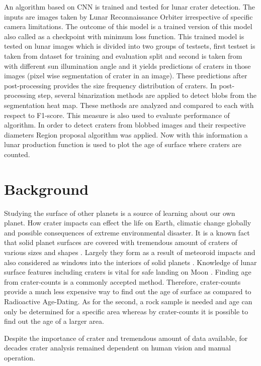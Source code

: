 \documentclass[11pt]{article}
\begin{document}
An algorithm based on CNN is trained and tested for lunar crater detection. The inputs are images taken by Lunar Reconnaissance Orbiter irrespective of specific camera limitations. The outcome of this model is a trained version of this model also called as a checkpoint with minimum loss function. This trained model is tested on lunar images which is divided into two groups of testsets, first testset is taken from dataset for training and evaluation split and second is taken from \cite{dino2020} with different sun illumination angle and it yields predictions of craters in those images (pixel wise segmentation of crater in an image). These predictions after post-processing provides the size frequency distribution of craters. In post-processing step, several binarization methods are applied to detect blobs from the segmentation heat map. These methods are analyzed and compared to each with respect to F1-score. This measure is also used to evaluate performance of algorithm. In order to detect craters from blobbed images and their respective diameters Region proposal algorithm was applied. Now with this information a lunar production function is used to plot the age of surface where craters are counted.

\section{Background}
Studying the surface of other planets is a source of learning about our own planet. How crater impacts can effect the life on Earth, climatic change globally and possible consequences of extreme environmental disaster. It is a known fact that solid planet surfaces are covered with tremendous amount of craters of various sizes and shapes \cite{melosh1988rocky}. Largely they form as a result of meteoroid impacts and also considered as windows into the interiors of solid planets \cite{honda2000crater}. Knowledge of lunar surface features including craters is vital for safe landing on Moon \cite{ivanov2015probabilistic}. Finding age from crater-counts is a commonly accepted method. Therefore, crater-counts provide a much less expensive way to find out the age of surface as compared to Radioactive Age-Dating. As for the second, a rock sample is needed and age can only be determined for a specific area whereas by crater-counts it is possible to find out the age of a larger area.

Despite the importance of crater and tremendous amount of data available, for decades crater analysis remained dependent on human vision and manual operation. 
\end{document}
